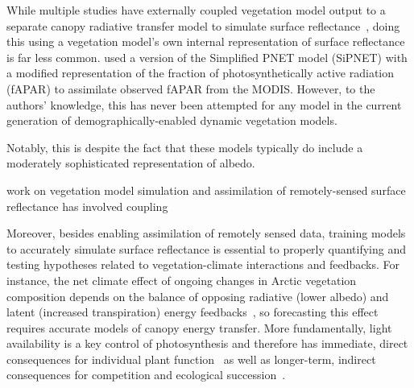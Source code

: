 While multiple studies have externally coupled vegetation model output to a separate canopy radiative transfer model to simulate surface reflectance~\parencite{knorr2001assimilation, nouvellon2001coupling, quaife2008assimilating},
doing this using a vegetation model's own internal representation of surface reflectance is far less common.
\Textcite{zobitz_2014_joint} used a version of the Simplified PNET model (SiPNET) with a modified representation of the fraction of photosynthetically active radiation (fAPAR) to assimilate observed fAPAR from the MODIS.
However, to the authors' knowledge, this has never been attempted for any model in the current generation of demographically-enabled dynamic vegetation models.

Notably, this is despite the fact that these models typically do include a moderately sophisticated representation of albedo.

work on vegetation model simulation and assimilation of remotely-sensed surface reflectance has involved coupling

Moreover, besides enabling assimilation of remotely sensed data, training models to accurately simulate surface reflectance is essential to properly quantifying and testing hypotheses related to vegetation-climate interactions and feedbacks.
For instance, the net climate effect of ongoing changes in Arctic vegetation composition depends on the balance of opposing radiative (lower albedo) and latent (increased transpiration) energy feedbacks~\parencite{swann2010changes}, so forecasting this effect requires accurate models of canopy energy transfer.
More fundamentally, light availability is a key control of photosynthesis and therefore has
immediate, direct consequences for individual plant function~\parencite{hikosaka1995model, robakowski_2004_growth, niinemets2016withincanopy, keenan2016global}
as well as longer-term, indirect consequences for competition and ecological succession~\parencite{niinemets2006tolerance, kitajima2013leaf, falster2017multitrait}.

